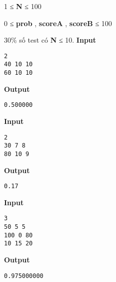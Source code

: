 1 ≤ \textbf{ N } ≤ 100

0 ≤ \textbf{ prob } , \textbf{ scoreA } , \textbf{ scoreB } ≤ 100

30\% số test có \textbf{ N } ≤ 10.
\textbf{Input }
\begin{verbatim}
2
40 10 10
60 10 10\end{verbatim}

\textbf{Output }
\begin{verbatim}
0.500000\end{verbatim}

\textbf{Input }
\begin{verbatim}
2
30 7 8
80 10 9\end{verbatim}

\textbf{Output }
\begin{verbatim}
0.17\end{verbatim}

\textbf{Input }
\begin{verbatim}
3
50 5 5
100 0 80
10 15 20\end{verbatim}

\textbf{Output }
\begin{verbatim}
0.975000000\end{verbatim}